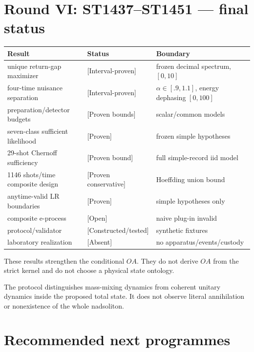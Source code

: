 \documentclass[11pt,a4paper]{article}
\newcommand{\status}[1]{\textsf{[#1]}}
\begin{document}
\section{Round VI: ST1437--ST1451 --- final status}

\begin{longtable}{@{}p{}p{}p{}@{}}
\toprule
Result & Status & Boundary \\
\midrule\endhead
unique return-gap maximizer & \status{Interval-proven} & frozen decimal spectrum, $[0,10]$ \\
four-time nuisance separation & \status{Interval-proven} & $\alpha\in[.9,1.1]$, energy dephasing $[0,100]$ \\
preparation/detector budgets & \status{Proven bounds} & scalar/common models \\
seven-class sufficient likelihood & \status{Proven} & frozen simple hypotheses \\
29-shot Chernoff sufficiency & \status{Proven bound} & full simple-record iid model \\
1146 shots/time composite design & \status{Proven conservative} & Hoeffding union bound \\
anytime-valid LR boundaries & \status{Proven} & simple hypotheses only \\
composite e-process & \status{Open} & naive plug-in invalid \\
protocol/validator & \status{Constructed/tested} & synthetic fixtures \\
laboratory realization & \status{Absent} & no apparatus/events/custody \\
\bottomrule
\end{longtable}

These results strengthen the conditional $OA$.  They do not derive $OA$ from
the strict kernel and do not choose a physical state ontology.

The protocol distinguishes mass-mixing dynamics from coherent unitary
dynamics inside the proposed total state.  It does not observe literal
annihilation or nonexistence of the whole nadsoliton.

\section{Recommended next programmes}
\end{document}
